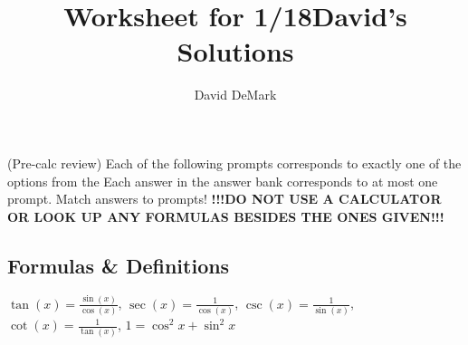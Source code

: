 \documentclass[english]{article}
\title{Worksheet for 1/18\textemdash David's Solutions}
\author{David DeMark}
\date{\due}
\newcommand{\prob}[1]{\setcounter{section}{#1-1}\section{}}
\theoremstyle{remark}
\theoremstyle{definition}
\begin{document}

		\prob{1}{(Pre-calc review) Each of the following prompts corresponds to exactly one of the options from the  Each answer in the answer bank corresponds to at most one prompt. Match answers to prompts! \textbf{!!!DO NOT USE A CALCULATOR OR LOOK UP ANY FORMULAS BESIDES THE ONES GIVEN!!!}}\newline
		\subsection*{Formulas \& Definitions}
		
		$\tan(x)=\frac{\sin(x)}{\cos(x)}$,
		$	\sec(x)=\frac{1}{\cos(x)}$,
		$	\csc(x)=\frac{1}{\sin(x)}$,
		$	\cot(x)=\frac{1}{\tan(x)}$,
$1=\cos^2x+\sin^2x$
\end{document}
